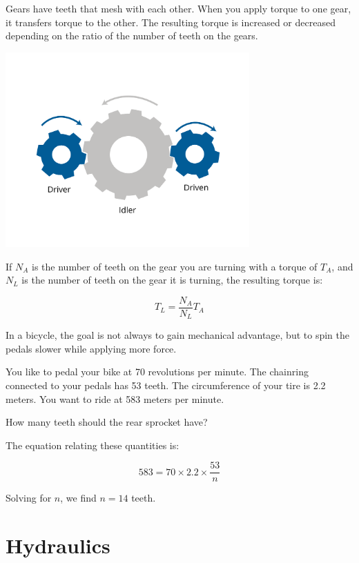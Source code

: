 Gears have teeth that mesh with each other. When you apply torque to one gear, it transfers torque to the other. The resulting torque is increased or decreased depending on the ratio of the number of teeth on the gears. 

\includegraphics[width=0.7\textwidth]{gearsNew.png}

If \( N_A \) is the number of teeth on the gear you are turning with a torque of \( T_A \), and \( N_L \) is the number of teeth on the gear it is turning, the resulting torque is:

\[
T_L = \frac{N_A}{N_L} T_A
\]
\begin{Exercise}[title={Gears}, label=gear]
In a bicycle, the goal is not always to gain mechanical advantage, but to spin the pedals slower while applying more force.

You like to pedal your bike at 70 revolutions per minute. The chainring connected to your pedals has 53 teeth. The circumference of your tire is 2.2 meters. You want to ride at 583 meters per minute.

How many teeth should the rear sprocket have?
\end{Exercise}
\begin{Answer}[ref=gear]
The equation relating these quantities is:

\[
583 = 70 \times 2.2 \times \frac{53}{n}
\]

Solving for \( n \), we find \( n = 14 \) teeth.
\end{Answer}

\section{Hydraulics}

